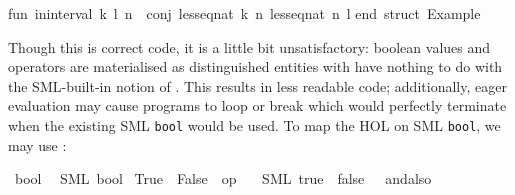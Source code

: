 \begin{isabellebody}
\begin{isamarkuptext}
\isanewline
fun\ in{}interval\ {}k{}\ l{}\ n\ {}\ conj\ {}less{}eq{}nat\ k\ n{}\ {}less{}eq{}nat\ n\ l{}{}\isanewline
\isanewline
end{}\ {}{}struct\ Example{}{}\isanewline%
\end{isamarkuptext}%
\isamarkuptrue%
%
\endisatagquotetypewriter
{\isafoldquotetypewriter}%
%
\isadelimquotetypewriter
%
\endisadelimquotetypewriter
%
\begin{isamarkuptext}%
\noindent Though this is correct code, it is a little bit
  unsatisfactory: boolean values and operators are materialised as
  distinguished entities with have nothing to do with the SML-built-in
  notion of .  This results in less readable code;
  additionally, eager evaluation may cause programs to loop or break
  which would perfectly terminate when the existing SML \verb|bool| would be used.  To map the HOL  on SML \verb|bool|, we may use :%
\end{isamarkuptext}%
\isamarkuptrue%
%
\isadelimquotett
%
\endisadelimquotett
%
\isatagquotett
{}\isamarkupfalse%
\ bool\isanewline
\ \ {}SML\ {}bool{}{}\isanewline
{}\isamarkupfalse%
\ True\ \ False\ \ {}op\ {}{}\isanewline
\ \ {}SML\ {}true{}\ \ {}false{}\ \ {}{}\ andalso\ {}{}{}%

\end{isabellebody}
